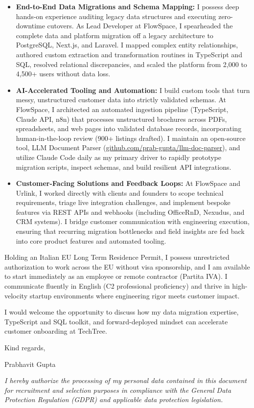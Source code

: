 \documentclass[10.5pt,a4paper]{article}
\begin{document}
\begin{itemize}
  \setlength{\itemsep}{1pt}
  \setlength{\parskip}{0pt}
  \item \textbf{End-to-End Data Migrations and Schema Mapping:} I possess deep hands-on experience auditing legacy data structures and executing zero-downtime cutovers. As Lead Developer at FlowSpace, I spearheaded the complete data and platform migration off a legacy architecture to PostgreSQL, Next.js, and Laravel. I mapped complex entity relationships, authored custom extraction and transformation routines in TypeScript and SQL, resolved relational discrepancies, and scaled the platform from 2,000 to 4,500+ users without data loss.
  \item \textbf{AI-Accelerated Tooling and Automation:} I build custom tools that turn messy, unstructured customer data into strictly validated schemas. At FlowSpace, I architected an automated ingestion pipeline (TypeScript, Claude API, n8n) that processes unstructured brochures across PDFs, spreadsheets, and web pages into validated database records, incorporating human-in-the-loop review (900+ listings drafted). I maintain an open-source tool, LLM Document Parser (\href{https://github.com/prab-gupta/llm-doc-parser}{github.com/prab-gupta/llm-doc-parser}), and utilize Claude Code daily as my primary driver to rapidly prototype migration scripts, inspect schemas, and build resilient API integrations.
  \item \textbf{Customer-Facing Solutions and Feedback Loops:} At FlowSpace and Urlink, I worked directly with clients and founders to scope technical requirements, triage live integration challenges, and implement bespoke features via REST APIs and webhooks (including OfficeRnD, Nexudus, and CRM systems). I bridge customer communication with engineering execution, ensuring that recurring migration bottlenecks and field insights are fed back into core product features and automated tooling.
\end{itemize}

Holding an Italian EU Long Term Residence Permit, I possess unrestricted authorization to work across the EU without visa sponsorship, and I am available to start immediately as an employee or remote contractor (Partita IVA). I communicate fluently in English (C2 professional proficiency) and thrive in high-velocity startup environments where engineering rigor meets customer impact.

I would welcome the opportunity to discuss how my data migration expertise, TypeScript and SQL toolkit, and forward-deployed mindset can accelerate customer onboarding at TechTree.

Kind regards,

Prabhavit Gupta

\vspace{0.3em}
{\footnotesize \textit{I hereby authorize the processing of my personal data contained in this document for recruitment and selection purposes in compliance with the General Data Protection Regulation (GDPR) and applicable data protection legislation.}\par}
\end{document}
